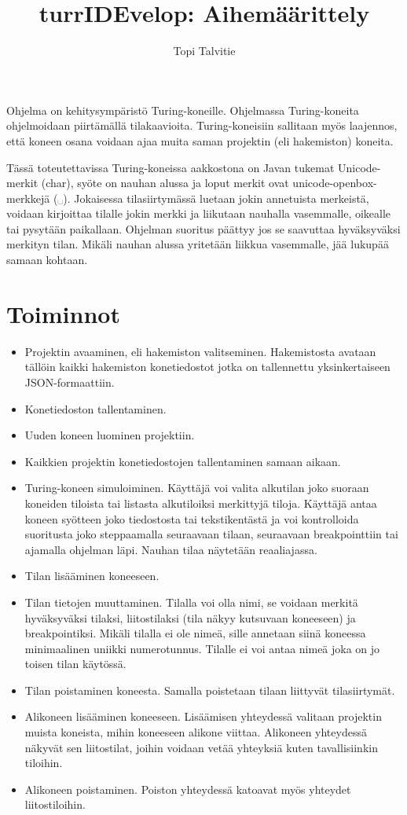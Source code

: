 \documentclass[a4paper, 11pt, finnish]{article}
\author{Topi Talvitie}
\title{turrIDEvelop: Aihemäärittely}
\begin{document}
\maketitle
Ohjelma on kehitysympäristö Turing-koneille. Ohjelmassa Turing-koneita
ohjelmoidaan piirtämällä tilakaavioita. Turing-koneisiin sallitaan myös
laajennos, että koneen osana voidaan ajaa muita saman projektin (eli
hakemiston) koneita.

Tässä toteutettavissa Turing-koneissa aakkostona on Javan tukemat
Unicode-merkit (char), syöte on nauhan alussa ja loput merkit ovat
unicode-openbox-merkkejä (␣). Jokaisessa tilasiirtymässä luetaan jokin
annetuista merkeistä, voidaan kirjoittaa tilalle jokin merkki ja liikutaan
nauhalla vasemmalle, oikealle tai pysytään paikallaan. Ohjelman suoritus
päättyy jos se saavuttaa hyväksyväksi merkityn tilan. Mikäli nauhan alussa
yritetään liikkua vasemmalle, jää lukupää samaan kohtaan.

\section*{Toiminnot}
\begin{itemize}
\item Projektin avaaminen, eli hakemiston valitseminen. Hakemistosta avataan
tällöin kaikki hakemiston konetiedostot jotka on tallennettu yksinkertaiseen
JSON-formaattiin.
\item Konetiedoston tallentaminen.
\item Uuden koneen luominen projektiin.
\item Kaikkien projektin konetiedostojen tallentaminen samaan aikaan.
\item Turing-koneen simuloiminen. Käyttäjä voi valita alkutilan joko suoraan
koneiden tiloista tai listasta alkutiloiksi merkittyjä tiloja.
Käyttäjä antaa koneen syötteen joko tiedostosta tai tekstikentästä ja voi
kontrolloida suoritusta joko steppaamalla seuraavaan tilaan, seuraavaan
breakpointtiin tai ajamalla ohjelman läpi. Nauhan tilaa näytetään reaaliajassa.
\item Tilan lisääminen koneeseen.
\item Tilan tietojen muuttaminen. Tilalla voi olla nimi, se voidaan merkitä
hyväksyväksi tilaksi, liitostilaksi (tila näkyy kutsuvaan koneeseen) ja
breakpointiksi. Mikäli tilalla ei ole nimeä, sille annetaan siinä koneessa
minimaalinen uniikki numerotunnus. Tilalle ei voi antaa nimeä joka on jo toisen
tilan käytössä.
\item Tilan poistaminen koneesta. Samalla poistetaan tilaan liittyvät
tilasiirtymät.
\item Alikoneen lisääminen koneeseen. Lisäämisen yhteydessä valitaan projektin
muista koneista, mihin koneeseen alikone viittaa. Alikoneen yhteydessä näkyvät
sen liitostilat, joihin voidaan vetää yhteyksiä kuten tavallisiinkin tiloihin.
\item Alikoneen poistaminen. Poiston yhteydessä katoavat myös yhteydet
liitostiloihin.
\end{itemize}
\end{document}
